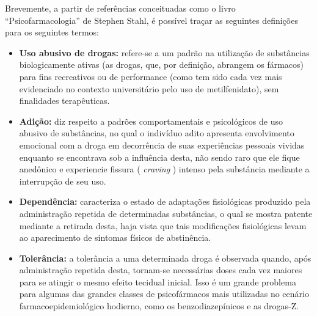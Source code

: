 \documentclass[
]{book}
\begin{document}
Brevemente, a partir de referências conceituadas como o livro ``Psicofarmacologia'' de Stephen Stahl, é possível traçar as seguintes definições para os seguintes termos:

\begin{itemize}
\item
  \textbf{Uso abusivo de drogas:} refere-se a um padrão na utilização de substâncias biologicamente ativas (as drogas, que, por definição, abrangem os fármacos) para fins recreativos ou de performance (como tem sido cada vez mais evidenciado no contexto universitário pelo uso de metilfenidato), sem finalidades terapêuticas.
\item
  \textbf{Adição:} diz respeito a padrões comportamentais e psicológicos de uso abusivo de substâncias, no qual o indivíduo adito apresenta envolvimento emocional com a droga em decorrência de suas experiências pessoais vividas enquanto se encontrava sob a influência desta, não sendo raro que ele fique anedônico e experiencie fissura ( \emph{craving} ) intenso pela substância mediante a interrupção de seu uso.
\item
  \textbf{Dependência:} caracteriza o estado de adaptações fisiológicas produzido pela administração repetida de determinadas substâncias, o qual se mostra patente mediante a retirada desta, haja vista que tais modificações fisiológicas levam ao aparecimento de sintomas físicos de abstinência.
\item
  \textbf{Tolerância:} a tolerância a uma determinada droga é observada quando, após administração repetida desta, tornam-se necessárias doses cada vez maiores para se atingir o mesmo efeito tecidual inicial. Isso é um grande problema para algumas das grandes classes de psicofármacos mais utilizadas no cenário farmacoepidemiológico hodierno, como os benzodiazepínicos e as drogas-Z.
\end{itemize}

  
\end{document}
